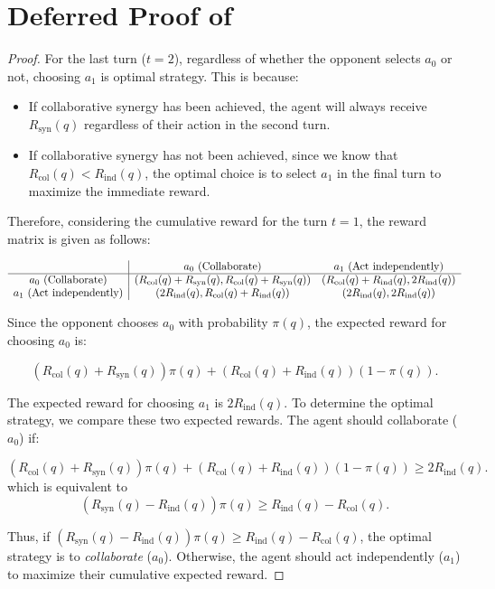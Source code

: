 \section{Deferred Proof of }
\label{appendix_defproof}
\claimsingle*
\begin{proof}
For the last turn (\( {t} = 2 \)), regardless of whether the opponent selects \( a_0 \) or not, choosing \( a_1 \) is  optimal strategy. This is because:
\begin{itemize}
    \item If collaborative synergy has been  achieved, the agent will always receive \( R_{\text{syn}}(q) \) regardless of their action in the second turn.
    \item If collaborative synergy has not been achieved, since we know that \( R_{\text{col}}(q) < R_{\text{ind}}(q) \), the optimal choice is to select \( a_1 \) in the final turn to maximize the immediate reward.
\end{itemize}


Therefore, considering the cumulative reward for the turn $t=1$, the 
reward matrix is given as follows: 

\[
\begin{array}{c|cc}
 & \text{\( a_0 \) (Collaborate)} & \text{\( a_1 \) (Act independently)} \\ \hline
\text{\( a_0 \) (Collaborate)} & (R_{\text{col}}(q) + R_{\text{syn}}(q), R_{\text{col}}(q) + R_{\text{syn}}(q)) & (R_{\text{col}}(q) + R_{\text{ind}}(q), 2R_{\text{ind}}(q)) \\
\text{\( a_1 \) (Act independently)} & (2R_{\text{ind}}(q), R_{\text{col}}(q) + R_{\text{ind}}(q)) & (2R_{\text{ind}}(q), 2R_{\text{ind}}(q)) \\
\end{array}
\]

Since the opponent chooses \( a_0 \) with probability \( \pi(q) \), the expected reward for choosing \( a_0 \) is:

\[
(R_{\text{col}}(q) + R_{\text{syn}}(q)) \pi(q) + (R_{\text{col}}(q) + R_{\text{ind}}(q))(1-\pi(q)).
\]

The expected reward for choosing \( a_1 \) is $2R_{\text{ind}}(q)$. To determine the optimal strategy, we compare these two expected rewards. The agent should collaborate (\( a_0 \)) if:

\[
(R_{\text{col}}(q) + R_{\text{syn}}(q)) \pi(q) + (R_{\text{col}}(q) + R_{\text{ind}}(q))(1-\pi(q)) \geq  2R_{\text{ind}}(q).
\]
which is equivalent to 
\[
(R_{\text{syn}}(q) - R_{\text{ind}}(q))\pi(q) \geq R_{\text{ind}}(q) - R_{\text{col}}(q).
\]

Thus, if \( (R_{\text{syn}}(q) - R_{\text{ind}}(q))\pi(q) \geq R_{\text{ind}}(q) - R_{\text{col}}(q) \), the optimal strategy is to \textit{collaborate} (\( a_0 \)). Otherwise, the agent should act independently (\( a_1 \)) to maximize their cumulative expected reward.
\end{proof}

